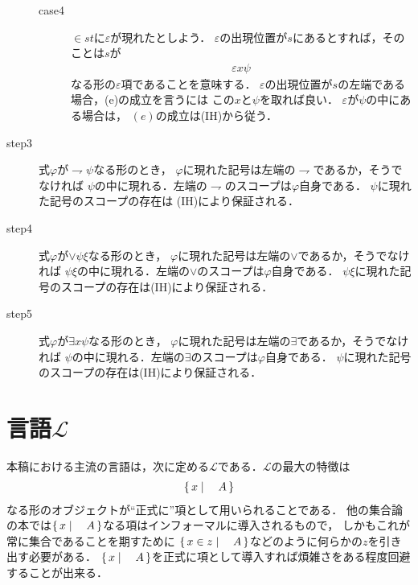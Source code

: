 \begin{metaprf}
\begin{description}
\begin{description}
					\item[case4]
						$\in s t$に$\varepsilon$が現れたとしよう．
						$\varepsilon$の出現位置が$s$にあるとすれば，そのことは$s$が
						\begin{align}
							\varepsilon x \psi
						\end{align}
						なる形の$\varepsilon$項であることを意味する．
						$\varepsilon$の出現位置が$s$の左端である場合，(e)の成立を言うには
						この$x$と$\psi$を取れば良い．
						$\varepsilon$が$\psi$の中にある場合は，
						$(e)$の成立は(IH)から従う．
				\end{description}
				
			\item[step3]
				式$\varphi$が$\rightharpoondown \psi$なる形のとき，
				$\varphi$に現れた記号は左端の$\rightharpoondown$であるか，そうでなければ
				$\psi$の中に現れる．左端の$\rightharpoondown$のスコープは$\varphi$自身である．
				$\psi$に現れた記号のスコープの存在は
				(IH)により保証される．
				
			\item[step4]
				式$\varphi$が$\vee \psi \xi$なる形のとき，
				$\varphi$に現れた記号は左端の$\vee$であるか，そうでなければ
				$\psi \xi$の中に現れる．左端の$\vee$のスコープは$\varphi$自身である．
				$\psi \xi$に現れた記号のスコープの存在は(IH)により保証される．
			
			\item[step5]
				式$\varphi$が$\exists x \psi$なる形のとき，
				$\varphi$に現れた記号は左端の$\exists$であるか，そうでなければ
				$\psi$の中に現れる．左端の$\exists$のスコープは$\varphi$自身である．
				$\psi$に現れた記号のスコープの存在は(IH)により保証される．
				\QED
		\end{description}
	\end{metaprf}
	
\section{言語$\mathcal{L}$}
	本稿における主流の言語は，次に定める$\mathcal{L}$である．$\mathcal{L}$の最大の特徴は
	\begin{align}
		\left\{\, x \mid \quad A\, \right\}
	\end{align}
	なる形のオブジェクトが``正式に''項として用いられることである．
	他の集合論の本では$\left\{\, x \mid \quad A\, \right\}$なる項はインフォーマルに導入されるもので，
	しかもこれが常に集合であることを期すために
	$\left\{\, x \in z \mid \quad A\, \right\}$などのように何らかの$z$を引き出す必要がある．
	$\left\{\, x \mid \quad A\, \right\}$を正式に項として導入すれば煩雑さをある程度回避することが出来る．
	
